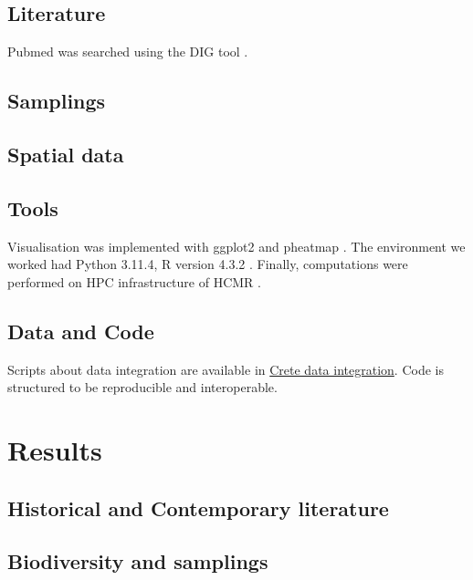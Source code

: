 \subsection{Literature}\label{crete-literature}

Pubmed was searched using the DIG tool \parencite{fanini2021coupling}.

\subsection{Samplings}\label{crete_samplings}

\subsection{Spatial data}\label{crete_spatial}


\subsection{Tools}\label{Coding environment}
Visualisation was implemented with ggplot2 \parencite{wickham_ggplot2_2016} and pheatmap \parencite{Kolde2019}.
The environment we worked had Python 3.11.4, R version 4.3.2 \parencite{rcoreteam}.
Finally, computations were performed on HPC infrastructure of HCMR \parencite{zafeiropoulos_0s_2021}.

\subsection{Data and Code}
Scripts about data integration are available in
\href{https://github.com/savvas-paragkamian/crete-data-integration}{Crete data integration}.
Code is structured to be reproducible and interoperable.

\section{Results}\label{crete_idea_results}

\subsection{Historical and Contemporary literature}


\subsection{Biodiversity and samplings}


